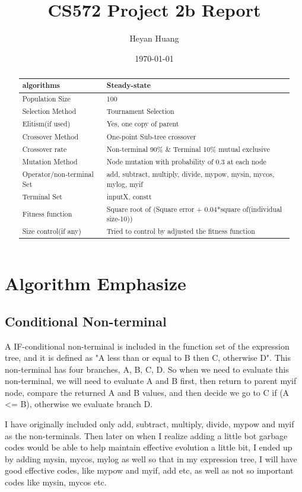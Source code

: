 \documentclass[10pt,b5paper]{article}
\author{Heyan Huang}
\date{\today}
\title{CS572 Project 2b Report}
\begin{document}
\maketitle
\tableofcontents

\begin{abstract}
\begin{center}
\begin{tabular}{ll}
\hline
algorithms & Steady-state\\
\hline
Population Size & 100\\
Selection Method & Tournament Selection\\
Elitism(if used) & Yes, one copy of parent\\
Crossover Method & One-point Sub-tree crossover\\
Crossover rate & Non-terminal 90\% \& Terminal 10\% mutual exclusive\\
Mutation Method & Node mutation with probability of 0.3 at each node\\
Operator/non-terminal Set & add, subtract, multiply, divide, mypow, mysin, mycos, mylog, myif\\
Terminal Set & inputX, constt\\
Fitness function & Square root of (Square error + 0.04*square of(individual size-10))\\
Size control(if any) & Tried to control by adjusted the fitness function\\
\hline
\end{tabular}
\end{center}
\end{abstract}


\section{Algorithm Emphasize}
\label{sec-1}
\subsection{Conditional Non-terminal}
\label{sec-1-1}
A IF-conditional non-terminal is included in the function set of the expression tree, and it is defined as "A less than or equal to B then C, otherwise D". This non-terminal has four branches, A, B, C, D. So when we need to evaluate this non-terminal, we will need to evaluate A and B first, then return to parent myif node, compare the returned A and B values, and then decide we go to C if (A <= B), otherwise we evaluate branch D.

I have originally included only add, subtract, multiply, divide, mypow and myif as the non-terminals. Then later on when I realize adding a little bot garbage codes would be able to help maintain effective evolution a little bit, I ended up by adding mysin, mycos, mylog as well so that in my expression tree, I will have good effective codes, like mypow and myif, add etc, as well as not so important codes like mysin, mycos etc.
\end{document}
